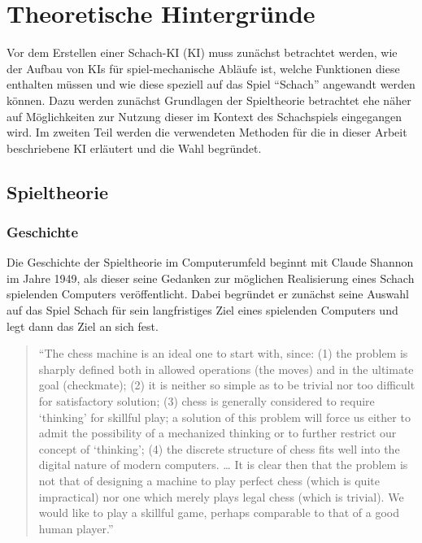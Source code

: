 
\newtheorem{definition}{Definition}[section]


\chapter{Theoretische Hintergründe}

Vor dem Erstellen einer Schach-\acs{KI} (\acl{KI}) muss zunächst betrachtet werden, wie der Aufbau von KIs für spiel-mechanische Abläufe ist, welche Funktionen diese enthalten müssen und wie diese speziell auf das Spiel ``Schach'' angewandt werden können. Dazu werden zunächst Grundlagen der Spieltheorie betrachtet ehe näher auf Möglichkeiten zur Nutzung dieser im Kontext des Schachspiels eingegangen wird. Im zweiten Teil werden die verwendeten Methoden für die in dieser Arbeit beschriebene KI erläutert und die Wahl begründet.

\section{Spieltheorie}

\subsection{Geschichte}

Die Geschichte der Spieltheorie im Computerumfeld beginnt mit Claude Shannon im Jahre 1949, als dieser seine Gedanken zur möglichen Realisierung eines Schach spielenden Computers veröffentlicht. Dabei begründet er zunächst seine Auswahl auf das Spiel Schach für sein langfristiges Ziel eines spielenden Computers und legt dann das Ziel an sich fest.

\begin{quote}
“The chess machine is an ideal one to start with, since: (1) the problem is sharply defined both in allowed operations (the moves) and in the ultimate goal (checkmate); (2) it is neither so simple as to be trivial nor too difficult for satisfactory solution; (3) chess is generally considered to require ‘thinking’ for skillful play; a solution of this problem will force us either to admit the possibility of a mechanized thinking or to further restrict our concept of ‘thinking’; (4) the discrete structure of chess fits well into the digital nature of modern computers. … It is clear then that the problem is not that of designing a machine to play perfect chess (which is quite impractical) nor one which merely plays legal chess (which is trivial). We would like to play a skillful game, perhaps comparable to that of a good human player.”
\end{quote}

